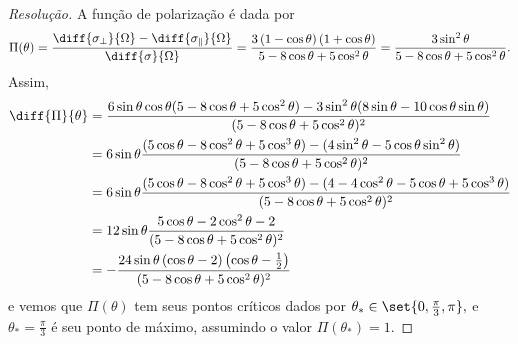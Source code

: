 \begin{proof}[Resolução]
   A função de polarização é dada por
   \begin{equation*}
      \Pi(\theta) = \frac{\diff{\sigma_\perp}{\Omega} - \diff{\sigma_\parallel}{\Omega}}{\diff{\sigma}{\Omega}} = \frac{3\left(1 - \cos\theta\right)\left(1 + \cos\theta\right)}{5 - 8 \cos\theta + 5\cos^2\theta} = \frac{3 \sin^2\theta}{5 - 8 \cos\theta + 5\cos^2\theta}.
   \end{equation*}
   Assim, 
   \begin{align*}
      \diff{\Pi}{\theta} &= \frac{6 \sin\theta \cos\theta (5 - 8 \cos\theta + 5 \cos^2\theta) - 3\sin^2\theta (8 \sin\theta - 10 \cos\theta\sin\theta)}{(5 - 8 \cos\theta + 5 \cos^2\theta)^2}\\
                         &= 6\sin\theta\frac{(5\cos\theta - 8 \cos^2\theta + 5 \cos^3\theta) - (4 \sin^2\theta - 5 \cos\theta\sin^2\theta)}{(5 - 8 \cos\theta + 5 \cos^2\theta)^2}\\
                         &= 6\sin\theta\frac{(5\cos\theta - 8 \cos^2\theta + 5 \cos^3\theta) - (4 - 4\cos^2\theta - 5 \cos\theta + 5 \cos^3\theta)}{(5 - 8 \cos\theta + 5 \cos^2\theta)^2}\\
                         &= 12 \sin\theta\frac{5 \cos\theta - 2\cos^2\theta - 2}{(5 - 8 \cos\theta + 5 \cos^2\theta)^2}\\
                         &= -\frac{24 \sin\theta \left(\cos\theta - 2\right)\left(\cos\theta - \frac12\right)}{(5 - 8 \cos\theta + 5 \cos^2\theta)^2}
   \end{align*}
   e vemos que \(\Pi(\theta)\) tem seus pontos críticos dados por \(\theta_* \in \set{0, \frac\pi3,\pi},\) e \(\theta_* = \frac\pi3\) é seu ponto de máximo, assumindo o valor \(\Pi(\theta_*) = 1.\)
\end{proof}
